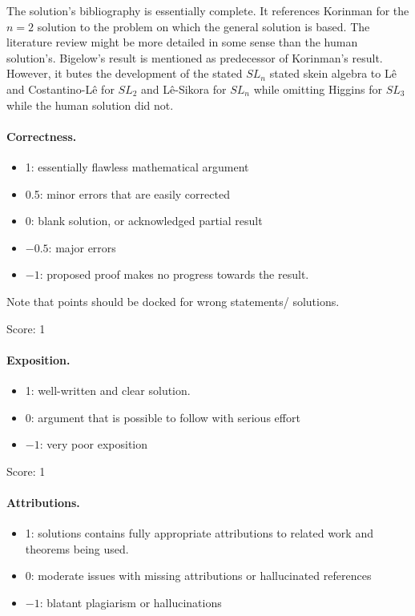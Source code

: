 \documentclass[11pt]{article}
\theoremstyle{remark}
\begin{document}
The solution's bibliography is essentially complete. It references Korinman for the $n=2$ solution to the problem on which the general solution is based. The literature review might be more detailed in some sense than the human solution's. Bigelow's result is mentioned as predecessor of Korinman's result. However, it butes the development of the stated $SL_n$ stated skein algebra to L\^{e} and Costantino-L\^{e} for $SL_2$ and L\^{e}-Sikora for $SL_n$ while omitting Higgins for $SL_3$ while the human solution did not.


\paragraph{Correctness.}
\begin{itemize}
	\item  1: essentially flawless mathematical argument
	\item  0.5: minor errors that are easily corrected
	\item  0: blank solution, or acknowledged partial result
	\item  $-0.5$: major errors
	\item  $-1$: proposed proof makes no progress towards the result.
\end{itemize}
Note that points should be docked for wrong statements/ solutions.

\noindent Score: 1

\paragraph{Exposition.}
\begin{itemize}
	\item  1: well-written and clear solution.
	\item  0: argument that is possible to follow with serious effort
	\item  $-1$: very poor exposition
\end{itemize}

\noindent Score: 1

\paragraph{Attributions.}
\begin{itemize}
	\item  1: solutions contains fully appropriate attributions
		to related work and theorems being used.
	\item  0: moderate issues with missing attributions or hallucinated references
	\item  $-1$: blatant plagiarism or hallucinations
\end{itemize}
\end{document}
